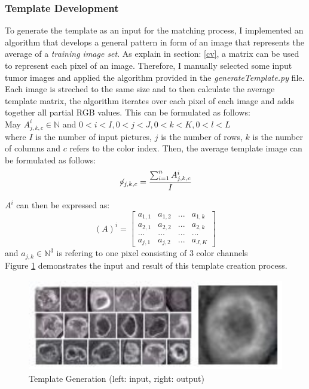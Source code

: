 \documentclass[twoside,11pt]{article}
\begin{document}
\subsubsection{Template Development}
\label{template-dev}
To generate the template as an input for the matching process, I implemented an algorithm that develops a general pattern in form of an image that represents the average of a \textit{training image set}. As explain in section: \ref{cv}, a matrix can be used to represent each pixel of an image. Therefore, I manually selected some input tumor images and applied the algorithm provided in the \textit{generateTemplate.py} file. Each image is streched to the same size and to then calculate the average template matrix, the algorithm iterates over each pixel of each image and adds together all partial RGB values. This can be formulated as follows: 
\\

May $A_{j,k,c}^{i} \in \mathbb{N}$  and $0 < i < I , 0 < j < J , 0 < k < K , 0 < l < L $  
\\

where $I$ is the number of input pictures, 
$j$ is the number of  rows, 
$k$ is the number of columns and
$c$ refers to the color index.
Then, the average template image can be formulated as follows:
$$
\not\!\circ_{j,k,c} = \frac{\sum_{i=1}^{n} A_{j,k,c}^{i}}{I}
$$

$A^{i}$ can then be expressed as:
\[
(A)^{i}=
\begin{bmatrix}
a_{1,1} & a_{1,2} &  ... & a_{1,k}\\ 
a_{2,1} & a_{2,2} &  ... & a_{2,k}\\ 
... & ... & ... & ... \\ 
a_{j,1} & a_{j,2} & ... & a_{J,K}
\end{bmatrix}
\]
and  $a_{j,k} \in \mathbb{N}^{3}$ is refering to one pixel consisting of 3 color channels
\\


Figure \ref{fig:template-generation} demonstrates the input and result of this template creation process.

\begin{figure}
	\label{fig:template-generation}
	\centering
	\includegraphics[height=4cm]{template-generation}
	\caption{Template Generation (left: input, right: output)}
\end{figure}%
\end{document}
